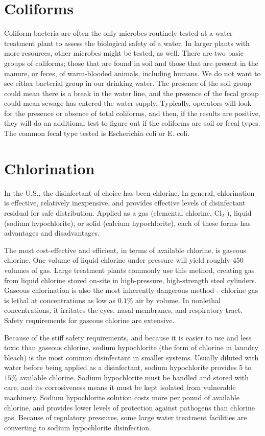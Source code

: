 \documentclass[10pt]{article}
\begin{document}
\section{Coliforms}
Coliform bacteria are often the only microbes routinely tested at a water treatment plant to assess the biological safety of a water. In larger plants with more resources, other microbes might be tested, as well. There are two basic groups of coliforms; those that are found in soil and those that are present in the manure, or feces, of warm-blooded animals, including humans. We do not want to see either bacterial group in our drinking water. The presence of the soil group could mean there is a break in the water line, and the presence of the fecal group could mean sewage has entered the water supply. Typically, operators will look for the presence or absence of total coliforms, and then, if the results are positive, they will do an additional test to figure out if the coliforms are soil or fecal types. The common fecal type tested is Escherichia coli or E. coli.

\section{Chlorination}
In the U.S., the disinfectant of choice has been chlorine. In general, chlorination is effective, relatively inexpensive, and provides effective levels of disinfectant residual for safe distribution. Applied as a gas (elemental chlorine, $\mathrm{Cl}_{2}$ ), liquid (sodium hypochlorite), or solid (calcium hypochlorite), each of these forms has advantages and disadvantages.

The most cost-effective and efficient, in terms of available chlorine, is gaseous chlorine. One volume of liquid chlorine under pressure will yield roughly 450 volumes of gas. Large treatment plants commonly use this method, creating gas from liquid chlorine stored on-site in high-pressure, high-strength steel cylinders. Gaseous chlorination is also the most inherently dangerous method - chlorine gas is lethal at concentrations as low as $0.1 \%$ air by volume. In nonlethal concentrations, it irritates the eyes, nasal membranes, and respiratory tract. Safety requirements for gaseous chlorine are extensive.

Because of the stiff safety requirements, and because it is easier to use and less toxic than gaseous chlorine, sodium hypochlorite (the form of chlorine in laundry bleach) is the most common disinfectant in smaller systems. Usually diluted with water before being applied as a disinfectant, sodium hypochlorite provides 5 to $15 \%$ available chlorine. Sodium hypochlorite must be handled and stored with care, and its corrosiveness means it must be kept isolated from vulnerable machinery. Sodium hypochlorite solution costs more per pound of available chlorine, and provides lower levels of protection against pathogens than chlorine gas. Because of regulatory pressures, some large water treatment facilities are converting to sodium hypochlorite disinfection.
\end{document}
